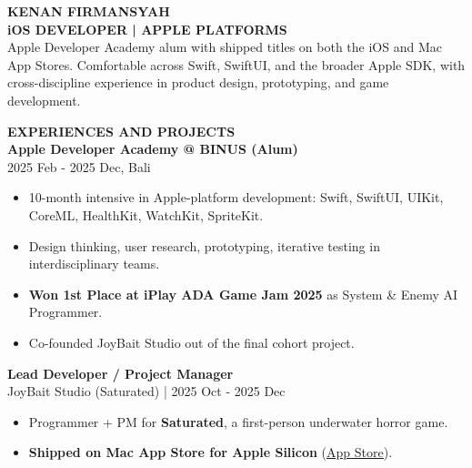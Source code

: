 \documentclass[11pt,a4paper]{article}
\newcommand{\mainsection}[1]{%
    {\large\bfseries\MakeUppercase{#1}}\\[8pt]%
}
\newcommand{\jobentry}[2]{%
    \textbf{#1}\\
    {\small\color{lighttext}#2}\\[4pt]%
}
\begin{document}
\begin{minipage}[t]{14cm}
\vspace{0.5cm}
\hspace{0.8cm}
\begin{minipage}[t]{12.5cm}

{\Huge\bfseries\MakeUppercase{Kenan Firmansyah}}\\[6pt]
{\large\bfseries iOS DEVELOPER | APPLE PLATFORMS}\\[12pt]

{\small Apple Developer Academy alum with shipped titles on both the iOS and Mac App Stores. Comfortable across Swift, SwiftUI, and the broader Apple SDK, with cross-discipline experience in product design, prototyping, and game development.}

\vspace{0.6cm}

\mainsection{Experiences and Projects}

\jobentry{Apple Developer Academy @ BINUS (Alum)}{2025 Feb - 2025 Dec, Bali}
\begin{itemize}[leftmargin=*, nosep, itemsep=2pt, topsep=2pt]
    \item 10-month intensive in Apple-platform development: Swift, SwiftUI, UIKit, CoreML, HealthKit, WatchKit, SpriteKit.
    \item Design thinking, user research, prototyping, iterative testing in interdisciplinary teams.
    \item \textbf{Won 1st Place at iPlay ADA Game Jam 2025} as System \& Enemy AI Programmer.
    \item Co-founded JoyBait Studio out of the final cohort project.
\end{itemize}

\vspace{0.4cm}

\jobentry{Lead Developer / Project Manager}{JoyBait Studio (Saturated) | 2025 Oct - 2025 Dec}
\begin{itemize}[leftmargin=*, nosep, itemsep=2pt, topsep=2pt]
    \item Programmer + PM for \textbf{Saturated}, a first-person underwater horror game.
    \item \textbf{Shipped on Mac App Store for Apple Silicon} (\href{https://apps.apple.com/id/app/saturated/id6755347604}{\color{accent}\underline{App Store}}).
\end{itemize}

\vspace{0.4cm}


\end{minipage}
\end{minipage}
\end{document}

